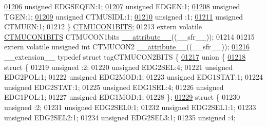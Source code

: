 \begin{DoxyCode}
\hypertarget{a00015_source_l01206}{}\hyperlink{a00014_aa05e0f03474daa69c3c9645bc5a0e8c2}{01206}   \textcolor{keywordtype}{unsigned} EDGSEQEN:1;
\hypertarget{a00015_source_l01207}{}\hyperlink{a00014_a6afa77037e4707f3a9838a2947dd502b}{01207}   \textcolor{keywordtype}{unsigned} EDGEN:1;
\hypertarget{a00015_source_l01208}{}\hyperlink{a00014_aaddfea02079b3d2db63b9eba724d521b}{01208}   \textcolor{keywordtype}{unsigned} TGEN:1;
\hypertarget{a00015_source_l01209}{}\hyperlink{a00014_a7ec560e3a5238e51f600c0fa5b2bb750}{01209}   \textcolor{keywordtype}{unsigned} CTMUSIDL:1;
\hypertarget{a00015_source_l01210}{}\hyperlink{a00014_acaf2d0924a107ec6e8d2e31febaf66f9}{01210}   \textcolor{keywordtype}{unsigned} :1;
\hypertarget{a00015_source_l01211}{}\hyperlink{a00014_acb81a973fd79e1167fab526beadf624d}{01211}   \textcolor{keywordtype}{unsigned} CTMUEN:1;
01212 \} \hyperlink{a00014_dd/db5/a00365}{CTMUCON1BITS};
01213 \textcolor{keyword}{extern} \textcolor{keyword}{volatile} \hyperlink{a00014_dd/db5/a00365}{CTMUCON1BITS} CTMUCON1bits \hyperlink{a00015_a493c46f03454991ccc5aa7a6e1dfb2a7}{\_\_attribute\_\_}((\_\_sfr\_\_));
01214 
01215 \textcolor{keyword}{extern} \textcolor{keyword}{volatile} \textcolor{keywordtype}{unsigned} \textcolor{keywordtype}{int}  CTMUCON2 \hyperlink{a00015_a493c46f03454991ccc5aa7a6e1dfb2a7}{\_\_attribute\_\_}((\_\_sfr\_\_));
\hypertarget{a00015_source_l01216}{}\hyperlink{a00014}{01216} \_\_extension\_\_ \textcolor{keyword}{typedef} \textcolor{keyword}{struct }tagCTMUCON2BITS \{
\hypertarget{a00015_source_l01217}{}\hyperlink{a00015}{01217}   \textcolor{keyword}{union }\{
\hypertarget{a00015_source_l01218}{}\hyperlink{a00015}{01218}     \textcolor{keyword}{struct }\{
01219       \textcolor{keywordtype}{unsigned} :2;
01220       \textcolor{keywordtype}{unsigned} EDG2SEL:4;
01221       \textcolor{keywordtype}{unsigned} EDG2POL:1;
01222       \textcolor{keywordtype}{unsigned} EDG2MOD:1;
01223       \textcolor{keywordtype}{unsigned} EDG1STAT:1;
01224       \textcolor{keywordtype}{unsigned} EDG2STAT:1;
01225       \textcolor{keywordtype}{unsigned} EDG1SEL:4;
01226       \textcolor{keywordtype}{unsigned} EDG1POL:1;
01227       \textcolor{keywordtype}{unsigned} EDG1MOD:1;
01228     \};
\hypertarget{a00015_source_l01229}{}\hyperlink{a00015}{01229}     \textcolor{keyword}{struct }\{
01230       \textcolor{keywordtype}{unsigned} :2;
01231       \textcolor{keywordtype}{unsigned} EDG2SEL0:1;
01232       \textcolor{keywordtype}{unsigned} EDG2SEL1:1;
01233       \textcolor{keywordtype}{unsigned} EDG2SEL2:1;
01234       \textcolor{keywordtype}{unsigned} EDG2SEL3:1;
01235       \textcolor{keywordtype}{unsigned} :4;

\end{DoxyCode}
